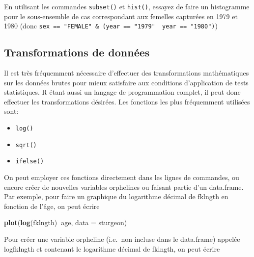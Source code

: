 \documentclass[12pt,]{book}
\makeatletter
\newenvironment{Shaded}{\begin{snugshade}}{\end{snugshade}}
\newcommand{\DataTypeTok}[1]{\textcolor[rgb]{0.27,0.27,0.27}{#1}}
\newcommand{\KeywordTok}[1]{\textcolor[rgb]{0.27,0.27,0.27}{\textbf{#1}}}
\newcommand{\NormalTok}[1]{#1}
\newcommand{\OperatorTok}[1]{\textcolor[rgb]{0.43,0.43,0.43}{\textbf{#1}}}
\newcommand{\StringTok}[1]{\textcolor[rgb]{0.5,0.5,0.5}{#1}}
\providecommand{\tightlist}{%
  \setlength{\itemsep}{0pt}\setlength{\parskip}{0pt}}
\newenvironment{kframe}{%
\medskip{}
\setlength{\fboxsep}{.8em}
 \def\at@end@of@kframe{}%
 \ifinner\ifhmode%
  \def\at@end@of@kframe{\end{minipage}}%
  \begin{minipage}{\columnwidth}%
 \fi\fi%
 \def\FrameCommand##1{\hskip\@totalleftmargin \hskip-\fboxsep
 \colorbox{shadecolor}{##1}\hskip-\fboxsep
     \hskip-\linewidth \hskip-\@totalleftmargin \hskip\columnwidth}%
 \MakeFramed {\advance\hsize-\width
   \@totalleftmargin\z@ \linewidth\hsize
   \@setminipage}}%
 {\par\unskip\endMakeFramed%
 \at@end@of@kframe}
\newenvironment{rmdblock}[1]
  {
  \begin{itemize}
  \renewcommand{\labelitemi}{
    \raisebox{-.7\height}[0pt][0pt]{
      {\setkeys{Gin}{width=3em,keepaspectratio}\texttt{[image: images/\#1]}}
    }
  }
  \setlength{\fboxsep}{1em}
  \begin{kframe}
  \item
  }
  {
  \end{kframe}
  \end{itemize}
  }
\newenvironment{rmdcode}
  {\begin{rmdblock}{screen}}
  {\end{rmdblock}}
\makeatother
\begin{document}
\begin{rmdcode}
En utilisant les commandes \texttt{subset()} et \texttt{hist()}, essayez de faire un histogramme pour le sous-ensemble de cas correspondant aux femelles capturées en 1979 et 1980 (donc \texttt{sex\ ==\ "FEMALE"\ \&\ (year\ ==\ "1979"\ \textbar{}\ year\ ==\ "1980")})
\end{rmdcode}

\hypertarget{transformations-de-donnuxe9es}{%
\subsection{Transformations de données}\label{transformations-de-donnuxe9es}}

Il est très fréquemment nécessaire d'effectuer des transformations mathématiques sur les données brutes pour mieux satisfaire aux conditions d'application de tests statistiques.
R étant aussi un langage de programmation complet, il peut donc effectuer les transformations désirées.
Les fonctions les plus fréquemment utilisées sont:

\begin{itemize}
\tightlist
\item
  \texttt{log()}
\item
  \texttt{sqrt()}
\item
  \texttt{ifelse()}
\end{itemize}

On peut employer ces fonctions directement dans les lignes de commandes, ou encore créer de nouvelles variables orphelines ou faisant partie d'un data.frame.
Par exemple, pour faire un graphique du logarithme décimal de fklngth en fonction de l'âge, on peut écrire

\begin{Shaded}
\begin{Highlighting}[]
\KeywordTok{plot}\NormalTok{(}\KeywordTok{log}\NormalTok{(fklngth)}\OperatorTok{~}\NormalTok{age, }\DataTypeTok{data =}\NormalTok{ sturgeon)}
\end{Highlighting}
\end{Shaded}

Pour créer une variable orpheline (i.e.~non incluse dans le data.frame) appelée logfklngth et contenant le logarithme décimal de fklngth, on peut écrire

\begin{Shaded}
\end{Shaded}
\end{document}
